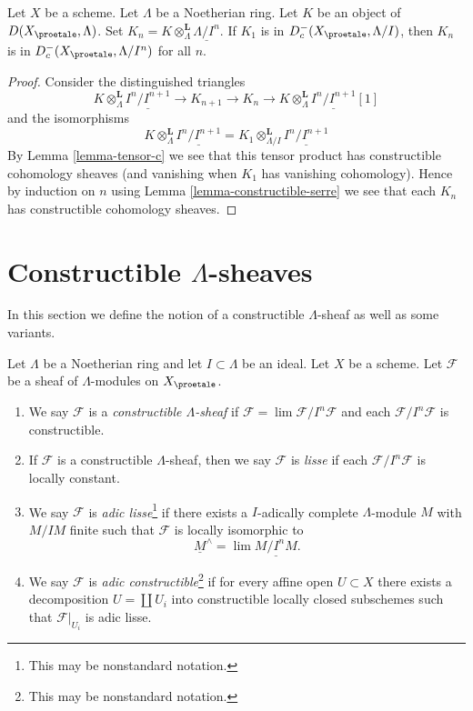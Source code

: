 \begin{lemma}
\label{lemma-compare-truncations-constructible}
Let $X$ be a scheme. Let $\Lambda$ be a Noetherian ring.
Let $K$ be an object of $D(X_\proetale, \Lambda)$.
Set $K_n = K \otimes_\Lambda^\mathbf{L} \underline{\Lambda/I^n}$.
If $K_1$ is in $D^-_c(X_\proetale, \Lambda/I)$, then
$K_n$ is in $D^-_c(X_\proetale, \Lambda/I^n)$ for all $n$.
\end{lemma}

\begin{proof}
Consider the distinguished triangles
$$
K \otimes_\Lambda^\mathbf{L} \underline{I^n/I^{n + 1}} \to
K_{n + 1} \to
K_n \to
K \otimes_\Lambda^\mathbf{L} \underline{I^n/I^{n + 1}}[1]
$$
and the isomorphisms
$$
K \otimes_\Lambda^\mathbf{L} \underline{I^n/I^{n + 1}} =
K_1 \otimes_{\Lambda/I}^\mathbf{L} \underline{I^n/I^{n + 1}}
$$
By Lemma \ref{lemma-tensor-c} we see that this tensor product has
constructible cohomology sheaves (and vanishing when $K_1$ has
vanishing cohomology). Hence by induction on $n$ using
Lemma \ref{lemma-constructible-serre}
we see that each $K_n$ has constructible cohomology sheaves.
\end{proof}








\section{Constructible $\Lambda$-sheaves}
\label{section-adic}

\noindent
In this section we define the notion of a constructible
$\Lambda$-sheaf as well as some variants.

\begin{definition}
\label{definition-adic}
Let $\Lambda$ be a Noetherian ring and let $I \subset \Lambda$ be an ideal.
Let $X$ be a scheme. Let $\mathcal{F}$ be a sheaf of $\Lambda$-modules
on $X_\proetale$.
\begin{enumerate}
\item We say $\mathcal{F}$ is a {\it constructible $\Lambda$-sheaf}
if $\mathcal{F} = \lim \mathcal{F}/I^n\mathcal{F}$ and each
$\mathcal{F}/I^n\mathcal{F}$ is constructible.
\item If $\mathcal{F}$ is a constructible $\Lambda$-sheaf, then we say
$\mathcal{F}$ is {\it lisse} if each $\mathcal{F}/I^n\mathcal{F}$ is
locally constant.
\item We say $\mathcal{F}$ is {\it adic lisse}\footnote{This may
be nonstandard notation.} if there exists a
$I$-adically complete $\Lambda$-module $M$ with $M/IM$ finite
such that $\mathcal{F}$ is locally isomorphic to
$$
\underline{M}^\wedge = \lim \underline{M/I^nM}.
$$
\item We say $\mathcal{F}$ is
{\it adic constructible}\footnote{This may be nonstandard notation.}
if for every affine open $U \subset X$
there exists a decomposition $U = \coprod U_i$ into
constructible locally closed subschemes such that $\mathcal{F}|_{U_i}$
is adic lisse.
\end{enumerate}
\end{definition}

